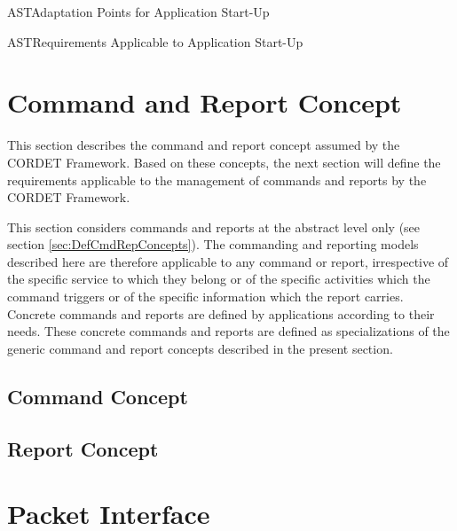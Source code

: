 \documentclass{pnp_article}
\begin{document}
\begin{crAp}{AST}{Adaptation Points for Application Start-Up}
\end{crAp}

\begin{crReq}{AST}{Requirements Applicable to Application Start-Up}
\end{crReq}

\section{Command and Report Concept}\label{sec:CmdAndRepConcept}
This section describes the command and report concept assumed by the CORDET Framework. 
Based on these concepts, the next section will define the requirements applicable to the management of commands and reports by the CORDET Framework.

This section considers commands and reports at the abstract level only (see section \ref{sec:DefCmdRepConcepts}). 
The commanding and reporting models described here are therefore applicable to any command or report, irrespective of the specific service to which they belong or of the specific activities which the command triggers or of the specific information which the report carries. 
Concrete commands and reports are defined by applications according to their needs. 
These concrete commands and reports are defined as specializations of the generic command and report concepts described in the present section. 



\subsection{Command Concept }\label{sec:CmdConcept}

 

\subsection{Report Concept }\label{sec:RepConcept}



\clearpage
\section{Packet Interface}\label{sec:PcktInterface}
\end{document}
